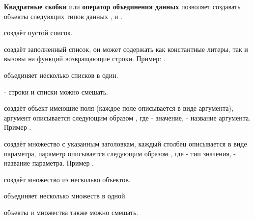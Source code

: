{\bf Квадратные скобки} или {\bf оператор объединения данных} позволяет создавать объекты следующих типов данных \listtype{}, \set{} и \object{}.

 создаёт пустой список.

 создаёт заполненный список, он может содержать как константные литеры, так и вызовы на функций возвращающие строки. Пример: \code{["a", "b", "c"]}.

 объединяет несколько списков в один.

 - строки и списки можно смешать.

 создаёт объект имеющие поля (каждое поле описывается в виде аргумента), аргумент описывается следующим образом , где  - значение,  - название аргумента. Пример \code{[number = 2, str = "str"]}.

 создаёт множество с указанным заголовкам, каждый столбец описывается в виде параметра, параметр описывается следующим образом , где  - тип значения,  - название параметра. Пример .

 создаёт множество из несколько объектов.

 объединяет несколько множеств в одной.

 объекты и множества также можно смешать.


